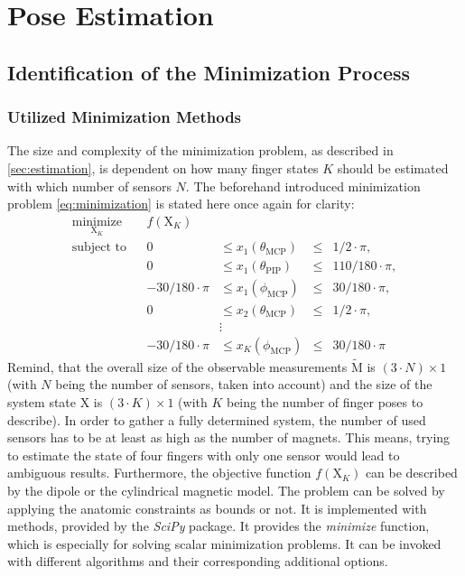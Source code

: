 \section{Pose Estimation} \label{sec:estimationRes}

\subsection{Identification of the Minimization Process} \label{subsec:resSim}

\subsubsection{Utilized Minimization Methods} \label{subsubsec:miniMethod}

The size and complexity of the minimization problem, as described in \ref{sec:estimation}, is dependent on how many finger states $ K $ should be estimated with which number of sensors $ N $. The beforehand introduced minimization problem \ref{eq:minimization} is stated here once again for clarity:
\begin{equation*} \label{eq:minimization}
\begin{aligned}
\underset{\mathrm{X}_K}{\text{minimize}} & & f(\mathrm{X}_K) \\
\text{subject to} & & 0 & \leq {x}_1(\theta_{\mathrm{MCP}}) & \leq & 1/2 \cdot \pi, \\
				  & & 0 & \leq {x}_1(\theta_{\mathrm{PIP}}) & \leq & 110/180 \cdot \pi, \\
				  & & -30/180 \cdot \pi & \leq {x}_1(\phi_{\mathrm{MCP}}) & \leq & 30/180 \cdot \pi, \\
				  & & 0 & \leq {x}_2(\theta_{\mathrm{MCP}}) & \leq & 1/2 \cdot \pi, \\
				  & & & \vdots \\
				  & & -30/180 \cdot \pi & \leq {x}_K(\phi_{\mathrm{MCP}}) & \leq & 30/180 \cdot \pi
\end{aligned}
\end{equation*}
Remind, that the overall size of the observable measurements $ \tilde{\mathrm{M}} $ is $ (3 \cdot N) \times 1 $ (with $ N $ being the number of sensors, taken into account) and the size of the system state $ \mathrm{X} $ is $ (3 \cdot K) \times 1 $ (with $ K $ being the number of finger poses to describe). In order to gather a fully determined system, the number of used sensors has to be at least as high as the number of magnets. This means, trying to estimate the state of four fingers with only one sensor would lead to ambiguous results. Furthermore, the objective function $ f(\mathrm{X}_K) $ can be described by the dipole or the cylindrical magnetic model. The problem can be solved by applying the anatomic constraints as bounds or not. It is implemented with methods, provided by the \emph{SciPy} package. It provides the \emph{minimize} function, which is especially for solving scalar minimization problems. It can be invoked with different algorithms and their corresponding additional options.

